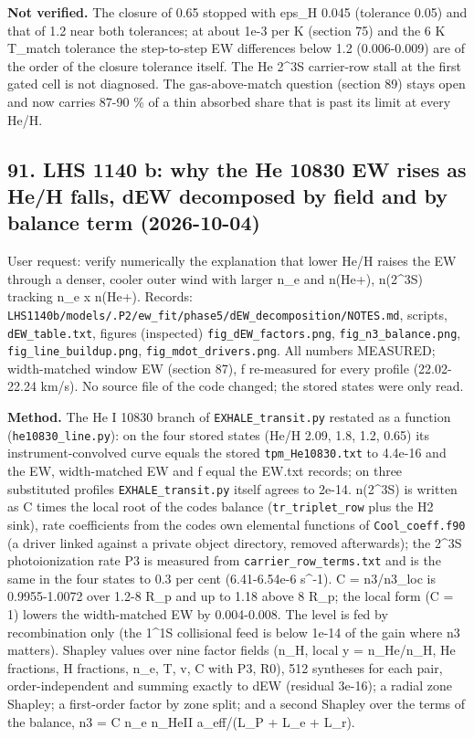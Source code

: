 \documentclass[english,a4paper]{my_memo}
\begin{document}
\textbf{Not verified.} The closure of 0.65 stopped with eps\_H 0.045 (tolerance
0.05) and that of 1.2 near both tolerances; at about 1e-3 per K (section
75) and the 6 K T\_match tolerance the step-to-step EW differences below
1.2 (0.006-0.009) are of the order of the closure tolerance itself. The
He 2\^{}3S carrier-row stall at the first gated cell is not diagnosed. The
gas-above-match question (section 89) stays open and now carries 87-90 \%
of a thin absorbed share that is past its limit at every He/H.

\subsection{91. LHS 1140 b: why the He 10830 EW rises as He/H falls, dEW decomposed by field and by balance term (2026-10-04)}\label{91-lhs-1140-b-why-the-he-10830-ew-rises-as-heh-falls-dew-decomposed-by-field-and-by-balance-term-2026-10-04}

User request: verify numerically the explanation that lower He/H raises the
EW through a denser, cooler outer wind with larger n\_e and n(He+), n(2\^{}3S)
tracking n\_e x n(He+). Records:
\texttt{LHS1140b/models/.P2/ew\_fit/phase5/dEW\_decomposition/NOTES.md}, scripts,
\texttt{dEW\_table.txt}, figures (inspected) \texttt{fig\_dEW\_factors.png},
\texttt{fig\_n3\_balance.png}, \texttt{fig\_line\_buildup.png}, \texttt{fig\_mdot\_drivers.png}. All
numbers MEASURED; width-matched window EW (section 87), f re-measured for
every profile (22.02-22.24 km/s). No source file of the code changed; the
stored states were only read.

\textbf{Method.} The He I 10830 branch of \texttt{EXHALE\_transit.py} restated as a
function (\texttt{he10830\_line.py}): on the four stored states (He/H 2.09, 1.8,
1.2, 0.65) its instrument-convolved curve equals the stored
\texttt{tpm\_He10830.txt} to 4.4e-16 and the EW, width-matched EW and f equal the
EW.txt records; on three substituted profiles \texttt{EXHALE\_transit.py} itself
agrees to 2e-14. n(2\^{}3S) is written as C times the local root of the
code\textquotesingle s balance (\texttt{tr\_triplet\_row} plus the H2 sink), rate coefficients from
the code\textquotesingle s own elemental functions of \texttt{Cool\_coeff.f90} (a driver linked
against a private object directory, removed afterwards); the 2\^{}3S
photoionization rate P3 is measured from \texttt{carrier\_row\_terms.txt} and is
the same in the four states to 0.3 per cent (6.41-6.54e-6 s\^{}-1).
C = n3/n3\_loc is 0.9955-1.0072 over 1.2-8 R\_p and up to 1.18 above 8 R\_p;
the local form (C = 1) lowers the width-matched EW by 0.004-0.008. The
level is fed by recombination only (the 1\^{}1S collisional feed is below
1e-14 of the gain where n3 matters). Shapley values over nine factor fields
(n\_H, local y = n\_He/n\_H, He fractions, H fractions, n\_e, T, v, C with P3,
R0), 512 syntheses for each pair, order-independent and summing exactly to
dEW (residual 3e-16); a radial zone Shapley; a first-order factor by zone
split; and a second Shapley over the terms of the balance,
n3 = C n\_e n\_HeII a\_eff/(L\_P + L\_e + L\_r).
\end{document}
